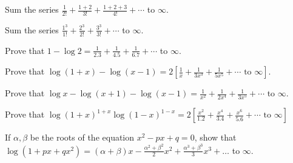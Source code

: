 \item Sum the series $\frac{1}{2!} + \frac{1 + 2}{3!} + \frac{1 + 2 +3}{4!} + \cdots$ to $\infty$.
\item Sum the series $\frac{1^3}{1!} + \frac{2^3}{2!} + \frac{3^3}{3!} + \cdots$ to $\infty$.
\item Prove that $1 - \log 2 = \frac{1}{2.3} + \frac{1}{4.5} + \frac{1}{6.7} + \cdots$ to $\infty$.
\item Prove that $\log(1 + x) - \log(x - 1) = 2\left[\frac{1}{x} + \frac{1}{3x^3} + \frac{1}{5x^5} + \cdots
  \text{~to~}\infty\right]$.
\item Prove that $\log x - \log(x + 1) - \log(x - 1) = \frac{1}{x^2} + \frac{1}{2x^4} + \frac{1}{3x^5} + \cdots$ to $\infty$.
\item Prove that $\log(1 + x)^{1 + x}\log(1 - x)^{1 - x} = 2\left[\frac{x^2}{1.2} + \frac{x^4}{3.4} + \frac{x^6}{5.6} + \cdots
  \text{~to~}\infty\right]$
\item If $\alpha, \beta$ be the roots of the equation $x^2 - px + q = 0$, show that $\log(1 + px + qx^2) = (\alpha + \beta)x -
  \frac{\alpha^2 + \beta^2}{2}x^2 + \frac{\alpha^3 + \beta^3}{3}x^3 + \ldots$ to $\infty$.
\stopitemize
